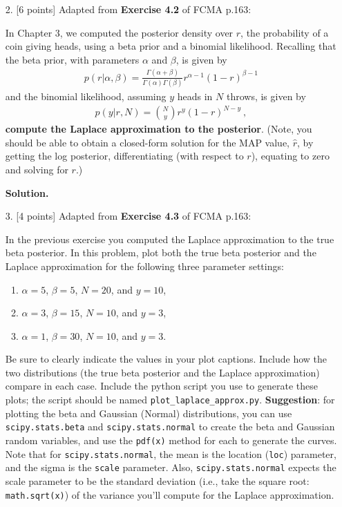 \documentclass[10pt]{article}
\begin{document}
\begin{itemize}
\item[2.]  [6 points]
Adapted from {\bf Exercise 4.2} of FCMA p.163:

In Chapter 3, we computed the posterior density over $r$, the probability of a coin giving heads, using a beta prior and a binomial likelihood.  Recalling that the beta prior, with parameters $\alpha$ and $\beta$, is given by
\begin{eqnarray*}
p(r | \alpha, \beta) = \frac{\Gamma(\alpha + \beta)}{\Gamma(\alpha) \Gamma(\beta)} r^{\alpha - 1} (1 - r)^{\beta - 1}
\end{eqnarray*}
and the binomial likelihood, assuming $y$ heads in $N$ throws, is given by
\begin{eqnarray*}
p(y | r, N) = {N \choose y} r^{y} (1 - r)^{N-y} ~,
\end{eqnarray*}
{\bf compute the Laplace approximation to the posterior}.  (Note, you should be able to obtain a closed-form solution for the MAP value, $\hat{r}$, by getting the log posterior, differentiating (with respect to $r$), equating to zero and solving for $r$.)

{\bf Solution.}




\item[3.]  [4 points]
Adapted from {\bf Exercise 4.3} of FCMA p.163:

In the previous exercise you computed the Laplace approximation to the true beta posterior.  In this problem, plot both the true beta posterior and the Laplace approximation for the following three parameter settings:
\begin{enumerate}
\item $\alpha = 5$, $\beta = 5$, $N = 20$, and $y = 10$,
\item $\alpha = 3$, $\beta = 15$, $N = 10$, and $y = 3$,
\item $\alpha = 1$, $\beta = 30$, $N = 10$, and $y = 3$.
\end{enumerate}
Be sure to clearly indicate the values in your plot captions.  Include how the two distributions (the true beta posterior and the Laplace approximation) compare in each case.  Include the python script you use to generate these plots; the script should be named {\tt plot\_laplace\_approx.py}.  {\bf Suggestion}: for plotting the beta and Gaussian (Normal) distributions, you can use {\tt scipy.stats.beta} and {\tt scipy.stats.normal} to create the beta and Gaussian random variables, and use the {\tt pdf(x)} method for each to generate the curves.  Note that for {\tt scipy.stats.normal}, the mean is the location ({\tt loc}) parameter, and the sigma is the {\tt scale} parameter.  Also, {\tt scipy.stats.normal} expects the scale parameter to be the standard deviation (i.e., take the square root: {\tt math.sqrt(x)}) of the variance you'll compute for the Laplace approximation.



\end{itemize}
\end{document}
